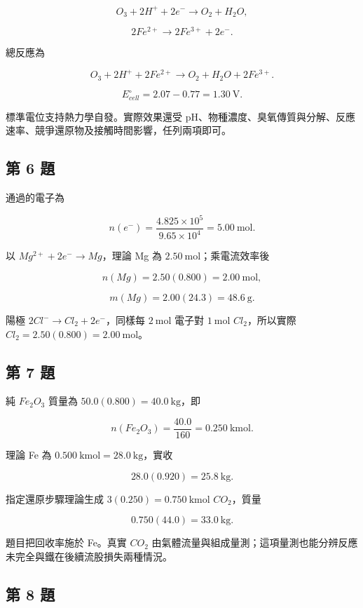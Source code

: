 \documentclass[11pt,a4paper]{article}
\begin{document}
\[
O_3+2H^++2e^-\rightarrow O_2+H_2O,
\]

\[
2Fe^{2+}\rightarrow2Fe^{3+}+2e^-.
\]

總反應為

\[
O_3+2H^++2Fe^{2+}\rightarrow O_2+H_2O+2Fe^{3+}.
\]

\[
E^\circ_{cell}=2.07-0.77=1.30\ \mathrm{V}.
\]

標準電位支持熱力學自發。實際效果還受 pH、物種濃度、臭氧傳質與分解、反應速率、競爭還原物及接觸時間影響，任列兩項即可。

\subsection{第 6 題}\label{ux7b2c-6-ux984c}

通過的電子為

\[
n(e^-)=\frac{4.825\times10^5}{9.65\times10^4}=5.00\ \mathrm{mol}.
\]

以 \(Mg^{2+}+2e^-\rightarrow Mg\)，理論 Mg 為 \(2.50\ \mathrm{mol}\)；乘電流效率後

\[
n(Mg)=2.50(0.800)=2.00\ \mathrm{mol},
\]

\[
m(Mg)=2.00(24.3)=48.6\ \mathrm{g}.
\]

陽極 \(2Cl^-\rightarrow Cl_2+2e^-\)，同樣每 \(2\ \mathrm{mol}\) 電子對 \(1\ \mathrm{mol}\) \(Cl_2\)，所以實際 \(Cl_2=2.50(0.800)=2.00\ \mathrm{mol}\)。

\subsection{第 7 題}\label{ux7b2c-7-ux984c}

純 \(Fe_2O_3\) 質量為 \(50.0(0.800)=40.0\ \mathrm{kg}\)，即

\[
n(Fe_2O_3)=\frac{40.0}{160}=0.250\ \mathrm{kmol}.
\]

理論 Fe 為 \(0.500\ \mathrm{kmol}=28.0\ \mathrm{kg}\)，實收

\[
28.0(0.920)=25.8\ \mathrm{kg}.
\]

指定還原步驟理論生成 \(3(0.250)=0.750\ \mathrm{kmol}\) \(CO_2\)，質量

\[
0.750(44.0)=33.0\ \mathrm{kg}.
\]

題目把回收率施於 Fe。真實 \(CO_2\) 由氣體流量與組成量測；這項量測也能分辨反應未完全與鐵在後續流股損失兩種情況。

\subsection{第 8 題}\label{ux7b2c-8-ux984c}
\end{document}
